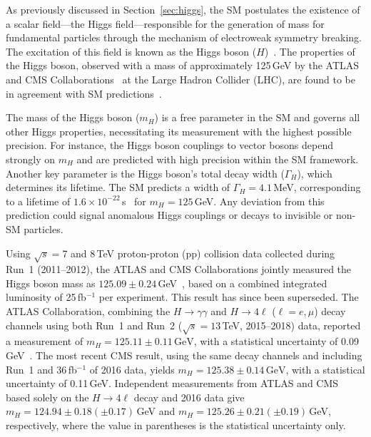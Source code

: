 As previously discussed in Section~\ref{sec:higgs}, the SM postulates the existence of a scalar field---the Higgs field---responsible for the generation of mass for fundamental particles through the mechanism of electroweak symmetry breaking. The excitation of this field is known as the Higgs boson ($H$)~\cite{StandardModel67_1, Englert:1964et, Higgs:1964ia, Higgs:1964pj, Guralnik:1964eu, StandardModel67_2, StandardModel67_3}. The properties of the Higgs boson, observed with a mass of approximately 125\,GeV by the ATLAS and CMS Collaborations~\cite{Aad:2012tfa, Chatrchyan:2012xdj, Chatrchyan:2013lba} at the Large Hadron Collider (LHC), are found to be in agreement with SM predictions~\cite{ATLASnature, CMSnature}. 

The mass of the Higgs boson ($m_H$) is a free parameter in the SM and governs all other Higgs properties, necessitating its measurement with the highest possible precision. For instance, the Higgs boson couplings to vector bosons depend strongly on $m_H$ and are predicted with high precision within the SM framework. Another key parameter is the Higgs boson's total decay width ($\Gamma_H$), which determines its lifetime. The SM predicts a width of $\Gamma_H = 4.1$\,MeV, corresponding to a lifetime of $1.6 \times 10^{-22}$\,s~\cite{deFlorian:2016spz} for $m_H = 125$\,GeV. Any deviation from this prediction could signal anomalous Higgs couplings or decays to invisible or non-SM particles.

Using $\sqrt{s} = $7 and 8\,TeV proton-proton (pp) collision data collected during Run~1 (2011–2012), the ATLAS and CMS Collaborations jointly measured the Higgs boson mass as $125.09 \pm 0.24$\,GeV~\cite{Aad:2015zhl}, based on a combined integrated luminosity of 25\,fb$^{-1}$ per experiment. This result has since been superseded. The ATLAS Collaboration, combining the $H \to \gamma\gamma$ and $H \to 4\ell$ ($\ell = e, \mu$) decay channels using both Run~1 and Run~2 ($\sqrt{s} = 13$\,TeV, 2015–2018) data, reported a measurement of $m_H = 125.11 \pm 0.11\,\mathrm{GeV}$, with a statistical uncertainty of 0.09\,GeV~\cite{ATLAS_mass}. The most recent CMS result, using the same decay channels and including Run~1 and 36\,fb$^{-1}$ of 2016 data, yields $m_H = 125.38 \pm 0.14\,\mathrm{GeV}$, with a statistical uncertainty of 0.11\,GeV. Independent measurements from ATLAS and CMS based solely on the $H \to 4\ell$ decay and 2016 data give $m_H = 124.94 \pm 0.18 (\pm 0.17)$\,GeV and $m_H = 125.26 \pm 0.21 (\pm 0.19)$\,GeV, respectively, where the value in parentheses is the statistical uncertainty only.

